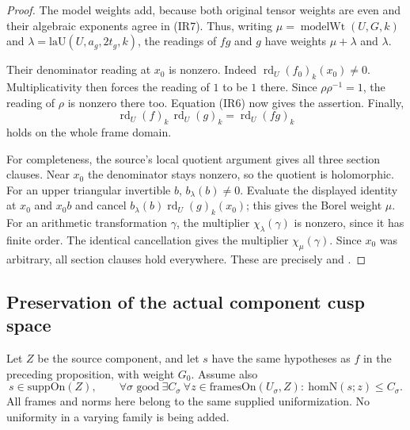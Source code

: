 \begin{proof}
The model weights add, because both original tensor weights are
even and their algebraic exponents agree in (IR7).
Thus, writing \(\mu=\operatorname{modelWt}(U,G,k)\) and
\(\lambda=\mathrm{laU}(U,a_g,2t_g,k)\), the readings of
\(fg\) and \(g\) have weights \(\mu+\lambda\) and \(\lambda\).

Their denominator reading at \(x_0\) is nonzero.
Indeed \(\operatorname{rd}_U(f_0)_k(x_0)\ne0\).
Multiplicativity then forces the reading of \(1\) to be \(1\)
there. Since \(\rho\rho^{-1}=1\), the reading of \(\rho\) is
nonzero there too. Equation (IR6) now gives the assertion.
Finally,
\[
    \operatorname{rd}_U(f)_k\,\operatorname{rd}_U(g)_k
                     =\operatorname{rd}_U(fg)_k
\]
holds on the whole frame domain.

For completeness, the source's local quotient argument gives
all three section clauses. Near \(x_0\) the denominator stays
nonzero, so the quotient is holomorphic.
For an upper triangular invertible \(b\),
\(b_\lambda(b)\ne0\).
Evaluate the displayed identity at \(x_0\) and \(x_0b\) and
cancel \(b_\lambda(b)\operatorname{rd}_U(g)_k(x_0)\);
this gives the Borel weight \(\mu\).
For an arithmetic transformation \(\gamma\), the multiplier
\(\chi_\lambda(\gamma)\) is nonzero, since it has finite order.
The identical cancellation gives the multiplier
\(\chi_\mu(\gamma)\).
Since \(x_0\) was arbitrary, all section clauses hold everywhere.
These are precisely
and .
\end{proof}

\subsection{Preservation of the actual component cusp space}
Let \(Z\) be the source component, and let \(s\) have the same
hypotheses as \(f\) in the preceding proposition, with weight \(G_0\).
Assume also
\[
 s\in\mathrm{suppOn}(Z),\qquad
 \forall\sigma\text{ good}\ \exists C_\sigma\
 \forall z\in\mathrm{framesOn}(U_\sigma,Z):\
                    \mathrm{homN}(s;z)\le C_\sigma .
 \tag{IR8}\label{eq:sr-source-component-bdd}
\]
All frames and norms here belong to the same supplied
uniformization. No uniformity in a varying family is being added.

